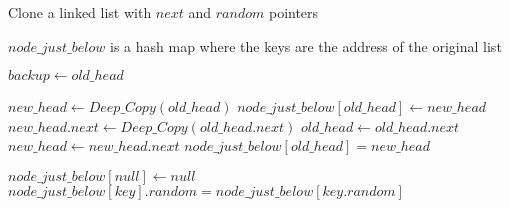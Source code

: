 \documentclass[12pt]{article}
\begin{document}
\begin{algorithm}

  \caption{Clone a linked list with $next$ and $random$ pointers}
  \begin{algorithmic}[1]
    \Statex
        \LeftComment $node\_just\_below$ is a hash map where the keys are the address of the original list 
        
        \Statex
            \State \Return{}
        \EndIf
        
        \Statex
        \State $backup \gets old\_head$ 
        
        \Statex
        \State $new\_head \gets Deep\_Copy(old\_head)$ 
        \State $node\_just\_below[old\_head] \gets new\_head$
         
            \State $new\_head.next \gets Deep\_Copy(old\_head.next)$
            \State $old\_head \gets old\_head.next$
            \State $new\_head \gets new\_head.next$
            \State $node\_just\_below[old\_head] = new\_head$ 
        \EndWhile
        
        \Statex
       
        \State $node\_just\_below[null] \gets null$
          
                \State $node\_just\_below[key].random = node\_just\_below[key.random]$ 
            \EndIf
        \EndFor
        
        \State {}
    \EndFunction
  \end{algorithmic}
  
\end{algorithm}
\end{document}
